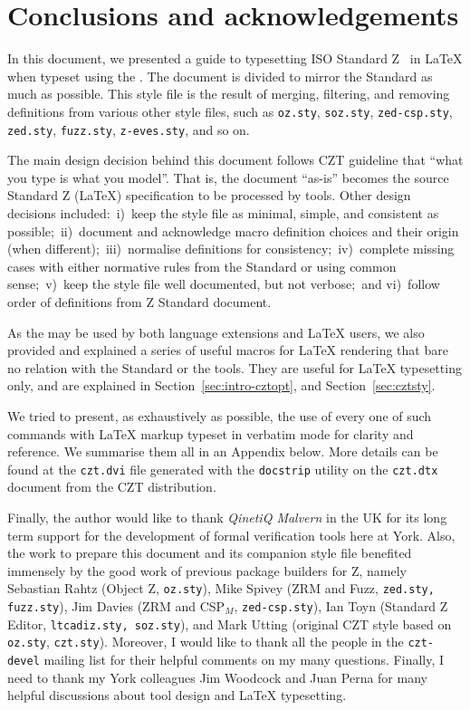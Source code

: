 \documentclass{article}
\newcommand{\emfile}[1]{\texttt{#1}}%
\begin{document}
\section{Conclusions and acknowledgements}\label{sec:conclusions}

In this document, we presented a guide to typesetting ISO Standard Z~\cite{isoz} in \LaTeX{}
when typeset using the \cztstylefile. The document is divided to mirror the
Standard as much as possible. This style file is the result of merging, filtering,
and removing definitions from various other style files, such as \texttt{oz.sty},
\texttt{soz.sty}, \texttt{zed-csp.sty}, \texttt{zed.sty}, \texttt{fuzz.sty},
\texttt{z-eves.sty}, and so on.

The main design decision behind this document follows CZT guideline that
``what you type is what you model''. That is, the document ``as-is'' becomes
the source Standard Z (\LaTeX) specification to be processed by tools. Other
design decisions included:~i)~keep the style file as minimal, simple, and
consistent as possible;~ii)~document and acknowledge macro definition choices
and their origin (when different);~iii)~normalise definitions for
consistency;~iv)~complete missing cases with either normative rules from
the Standard or using common sense;~v)~keep the style file well documented,
but not verbose;~and vi)~follow order of definitions from Z Standard document.

As the \cztstylefile{} may be used by both language extensions and \LaTeX{} users,
we also provided and explained a series of useful macros for \LaTeX{} rendering
that bare no relation with the Standard or the tools. They are useful for \LaTeX{}
typesetting only, and are explained in Section~\ref{sec:intro-cztopt}, and
Section~\ref{sec:cztsty}.

We tried to present, as exhaustively as possible, the use of every one
of such commands with \LaTeX{} markup typeset in verbatim mode for
clarity and reference. We summarise them all in an Appendix below.
More details can be found at the \texttt{czt.dvi} file generated with
the \texttt{docstrip} utility on the \texttt{czt.dtx} document from
the CZT distribution.

Finally, the author would like to thank \textit{QinetiQ Malvern} in the
UK for its long term support for the development of formal verification
tools here at York. Also, the work to prepare this document and its companion
style file benefited immensely by the good work of previous package
builders for Z, namely Sebastian Rahtz (Object Z, \emfile{oz.sty}),
Mike Spivey (ZRM and Fuzz, \emfile{zed.sty, fuzz.sty}), Jim Davies
(ZRM and CSP$_M$, \emfile{zed-csp.sty}), Ian Toyn (Standard Z Editor,
\emfile{ltcadiz.sty, soz.sty}), and Mark Utting (original CZT style
based on \emfile{oz.sty}, \emfile{czt.sty}). Moreover, I would like
to thank all the people in the \texttt{czt-devel} mailing list for
their helpful comments on my many questions. Finally, I need to
thank my York colleagues Jim Woodcock and Juan Perna for many helpful
discussions about tool design and \LaTeX{} typesetting.
\end{document}
